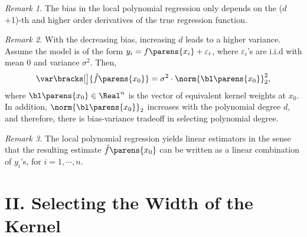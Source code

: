 \documentclass[12pt]{article}
\begin{document}
\begin{enumerate}[label=\textbf{\arabic*.}]
	\textit{Remark 1.} The bias in the local polynomial regression only depends on the ($d$+1)-th and higher order derivatives of the true regression function. 
	
	\textit{Remark 2.} With the decreasing bias, increasing $d$ leads to a higher variance. Assume the model is of the form $y_i = f \parens{x_i} + \varepsilon_i$, where $\varepsilon_i$'s are i.i.d with mean 0 and variance $\sigma^2$. Then, 
	\begin{align*}
		\var \bracks[\big]{\hat{f} \parens{x_0}} = \sigma^2 \cdot \norm{\bl \parens{x_0}}_2^2, 
	\end{align*}
	where $\bl \parens{x_0} \in \Real^n$ is the vector of equivalent kernel weights at $x_0$. In addition, $\norm{\bl \parens{x_0}}_2$ increases with the polynomial degree $d$, and therefore, there is bias-variance tradeoff in selecting polynomial degree. 
	
	\textit{Remark 3.} The local polynomial regression yields linear estimators in the sense that the resulting estimate $\hat{f} \parens{x_0}$ can be written as a linear combination of $y_i$'s, for $i = 1, \cdots, n$. 
\end{enumerate}

\section*{II. Selecting the Width of the Kernel} 
      
\end{document}
